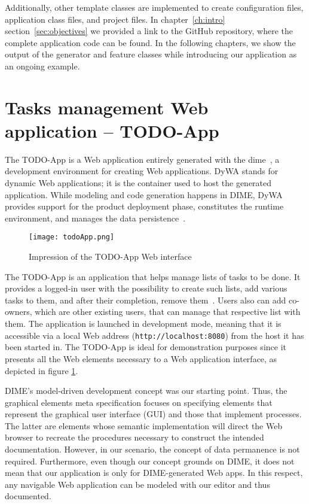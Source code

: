 Additionally, other template classes are implemented to create configuration files, application class files, and project files. In chapter~\ref{ch:intro} section~\ref{sec:objectives} we provided a link to the GitHub repository, where the complete application code can be found. In the following chapters, we show the output of the generator and feature classes while introducing our application as an ongoing example.

\section{Tasks management Web application -- TODO-App}\label{sec:todoApp}

The TODO-App is a Web application entirely generated with the \gls{dime}~\cite{bosselmann-et_al}, a development environment for creating Web applications. DyWA stands for dynamic Web applications; it is the container used to host the generated application. While modeling and code generation happens in DIME, DyWA provides support for the product deployment phase, constitutes the runtime environment, and manages the data persistence~\cite{bosselmann-et_al}.

\begin{figure}[h]
    \centering
    \texttt{[image: todoApp.png]}
    \caption{Impression of the TODO-App Web interface}
    \label{fig:todoApp}
\end{figure}

The TODO-App is an application that helps manage lists of tasks to be done. It provides a logged-in user with the possibility to create such lists, add various tasks to them, and after their completion, remove them~\cite{bosselmann-et_al}. Users also can add co-owners, which are other existing users, that can manage that respective list with them. The application is launched in development mode, meaning that it is accessible via a local Web address (\lstinline{http://localhost:8080}) from the host it has been started in. The TODO-App is ideal for demonstration purposes since it presents all the Web elements necessary to a Web application interface, as depicted in figure \ref{fig:todoApp}.

DIME's model-driven development concept was our starting point. Thus, the graphical elements meta specification focuses on specifying elements that represent the graphical user interface (GUI) and those that implement processes. The latter are elements whose semantic implementation will direct the Web browser to recreate the procedures necessary to construct the intended documentation. However, in our scenario, the concept of data permanence is not required. Furthermore, even though our concept grounds on DIME, it does not mean that our application is only for DIME-generated Web apps. In this respect, any navigable Web application can be modeled with our editor and thus documented.